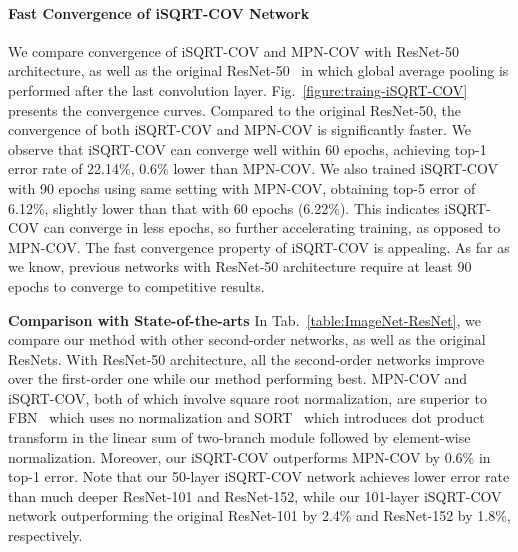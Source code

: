 \documentclass[10pt,twocolumn,letterpaper]{article}
\begin{document}
\vspace{-8pt}\paragraph{Fast Convergence of iSQRT-COV Network}
We compare convergence of iSQRT-COV and MPN-COV with ResNet-50 architecture, as well as the original ResNet-50~\cite{He_2016_CVPR} in which  global average pooling is performed after the last convolution layer. Fig.~\ref{figure:traing-iSQRT-COV} presents the convergence curves. Compared to the original ResNet-50, the convergence of both iSQRT-COV and MPN-COV is significantly faster. We  observe that  iSQRT-COV can converge well within 60 epochs, achieving top-1 error rate of 22.14\%, 0.6\% lower than MPN-COV. We also trained iSQRT-COV with  90 epochs using  same setting with MPN-COV, obtaining top-5 error of 6.12\%, slightly lower than  that with 60 epochs (6.22\%). This indicates  iSQRT-COV can converge in less epochs, so further accelerating training, as opposed to MPN-COV.   The fast convergence property of iSQRT-COV is appealing. As far as we know, previous networks with ResNet-50 architecture require at least 90 epochs to converge to  competitive results.


\vspace{4pt}\noindent\textbf{Comparison with State-of-the-arts}\quad 
In Tab.~\ref{table:ImageNet-ResNet}, we compare our method with other second-order networks, as well as the original ResNets. With ResNet-50 architecture, all the second-order networks improve over the first-order one while our method performing best. MPN-COV and iSQRT-COV, both of which involve square root normalization, are superior to  FBN~\cite{LiYanghao_2017_ICCV} which uses no normalization and SORT~\cite{Wang_2017_ICCV} which introduces dot product transform in the linear sum of two-branch module followed by element-wise normalization. Moreover, our iSQRT-COV  outperforms MPN-COV by  0.6\% in top-1 error. Note that our 50-layer iSQRT-COV network achieves lower error rate  than much deeper  ResNet-101 and ResNet-152, while our 101-layer iSQRT-COV network outperforming the original ResNet-101 by 2.4\% and ResNet-152 by 1.8\%, respectively.
\end{document}
